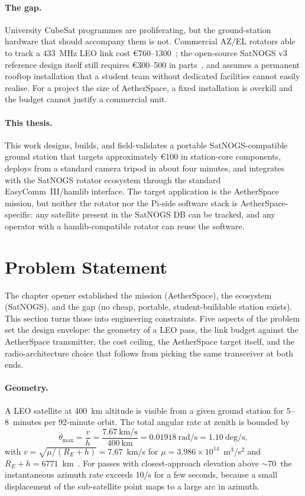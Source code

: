 \paragraph{The gap.}
University CubeSat programmes are proliferating, but the ground-station hardware that should accompany them is not. Commercial AZ/EL rotators able to track a 433~MHz LEO link cost \euro{}760--1300~\cite{yaesu-g5500,rfham-spid}; the open-source SatNOGS v3 reference design itself still requires \euro{}300--500 in parts~\cite{satnogs-v3,satnogs-v3-bom}, and assumes a permanent rooftop installation that a student team without dedicated facilities cannot easily realise. For a project the size of AetherSpace, a fixed installation is overkill and the budget cannot justify a commercial unit.

\paragraph{This thesis.}
This work designs, builds, and field-validates a portable SatNOGS-compatible ground station that targets approximately \euro{}100 in station-core components, deploys from a standard camera tripod in about four minutes, and integrates with the SatNOGS rotator ecosystem through the standard EasyComm~III/hamlib interface. The target application is the AetherSpace mission, but neither the rotator nor the Pi-side software stack is AetherSpace-specific: any satellite present in the SatNOGS DB can be tracked, and any operator with a hamlib-compatible rotator can reuse the software.

\section{Problem Statement}
\label{sec:problem-statement}

The chapter opener established the mission (AetherSpace), the ecosystem (SatNOGS), and the gap (no cheap, portable, student-buildable station exists). This section turns those into engineering constraints. Five aspects of the problem set the design envelope: the geometry of a LEO pass, the link budget against the AetherSpace transmitter, the cost ceiling, the AetherSpace target itself, and the radio-architecture choice that follows from picking the same transceiver at both ends.

\paragraph{Geometry.}
A LEO satellite at 400~km altitude is visible from a given ground station for 5--8~minutes per 92-minute orbit. The total angular rate at zenith is bounded by
\begin{equation}
    \dot{\theta}_{\max} = \frac{v}{h} = \frac{7.67~\text{km/s}}{400~\text{km}} = 0.01918~\text{rad/s} = 1.10~\text{deg/s},
\end{equation}
with $v = \sqrt{\mu/(R_E+h)} = 7.67$~km/s for $\mu = 3.986 \times 10^{14}$~m$^3$/s$^2$ and $R_E+h = 6771$~km~\cite{montenbruck2000orbits}. For passes with closest-approach elevation above $\sim$70\degree\ the instantaneous azimuth rate exceeds 10\degree/s for a few seconds, because a small displacement of the sub-satellite point maps to a large arc in azimuth.


